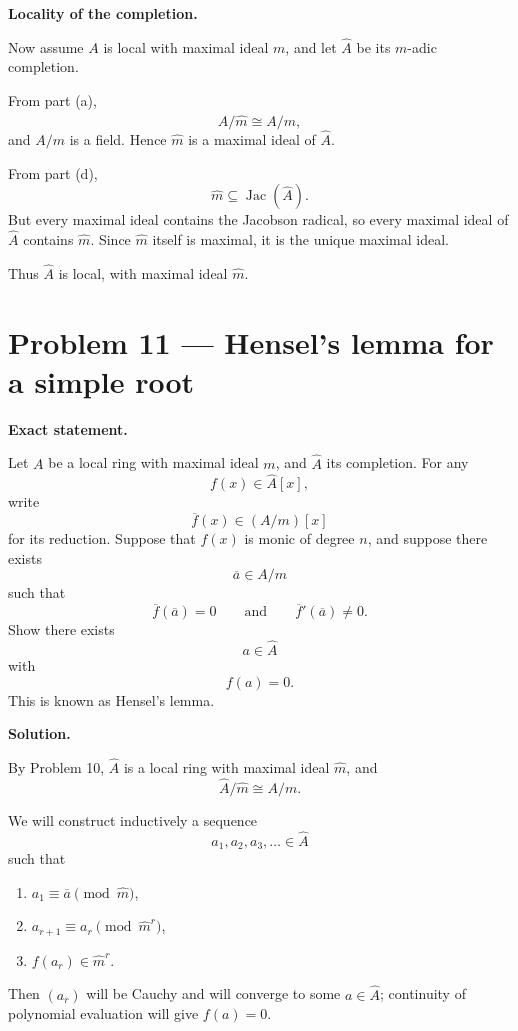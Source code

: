 \documentclass[12pt,a4paper]{article}
\theoremstyle{plain}
\theoremstyle{definition}      %
\begin{document}
	\medskip
	\textbf{Locality of the completion.}
	
	Now assume \(A\) is local with maximal ideal \(m\), and let \(\widehat A\) be its \(m\)-adic completion.
	
	From part (a),
	\[
	\widehat A/\widehat m \cong A/m,
	\]
	and \(A/m\) is a field. Hence \(\widehat m\) is a maximal ideal of \(\widehat A\).
	
	From part (d),
	\[
	\widehat m \subseteq \operatorname{Jac}(\widehat A).
	\]
	But every maximal ideal contains the Jacobson radical, so every maximal ideal of \(\widehat A\) contains \(\widehat m\). Since \(\widehat m\) itself is maximal, it is the unique maximal ideal.
	
	Thus \(\widehat A\) is local, with maximal ideal \(\widehat m\).
	
	
	
	\section*{Problem 11 --- Hensel's lemma for a simple root}
	
	\textbf{Exact statement.}
	
	Let \(A\) be a local ring with maximal ideal \(m\), and \(\widehat A\) its completion. For any
	\[
	f(x)\in \widehat A[x],
	\]
	write
	\[
	\overline f(x)\in (A/m)[x]
	\]
	for its reduction. Suppose that \(f(x)\) is monic of degree \(n\), and suppose there exists
	\[
	\overline a\in A/m
	\]
	such that
	\[
	\overline f(\overline a)=0
	\qquad\text{and}\qquad
	\overline f'(\overline a)\neq 0.
	\]
	Show there exists
	\[
	a\in \widehat A
	\]
	with
	\[
	f(a)=0.
	\]
	This is known as Hensel's lemma.
	
	\bigskip
	\textbf{Solution.}
	
	By Problem 10, \(\widehat A\) is a local ring with maximal ideal \(\widehat m\), and
	\[
	\widehat A/\widehat m \cong A/m.
	\]
	
	We will construct inductively a sequence
	\[
	a_1,a_2,a_3,\dots \in \widehat A
	\]
	such that
	\begin{enumerate}
		\item \(a_1 \equiv \overline a \pmod{\widehat m}\),
		\item \(a_{r+1}\equiv a_r \pmod{\widehat m^r}\),
		\item \(f(a_r)\in \widehat m^r\).
	\end{enumerate}
	Then \((a_r)\) will be Cauchy and will converge to some \(a\in \widehat A\); continuity of polynomial evaluation will give \(f(a)=0\).
	
\end{document}
